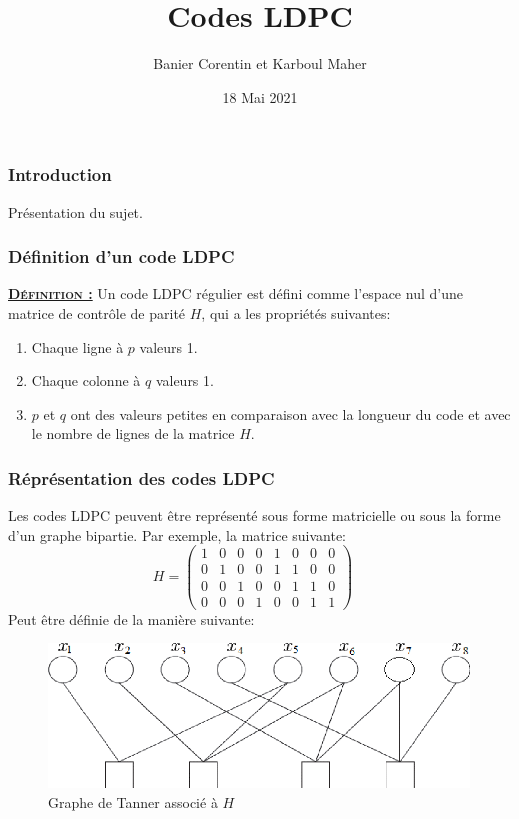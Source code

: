 \documentclass{beamer}
\title{Codes LDPC}
\author{Banier Corentin et Karboul Maher}
\institute{Université de Bordeaux}
\date{18 Mai 2021}
\begin{document}
	\begin{frame}
        \titlepage
	\end{frame}

    \begin{frame}
        \frametitle{Introduction}
        Présentation du sujet.
    \end{frame}

    \begin{frame}
        \frametitle{Définition d'un code LDPC}
        \textsc{\textbf{\underline{Définition :}}} Un code LDPC régulier est défini comme l'espace nul d'une matrice de contrôle de parité $H$, qui a les propriétés suivantes:
        \begin{enumerate}
            \item Chaque ligne à $p$ valeurs 1.
            \item Chaque colonne à $q$ valeurs 1.
            \item $p$ et $q$ ont des valeurs petites en comparaison avec la longueur du code et avec le nombre de lignes de la matrice $H$.
        \end{enumerate}
    \end{frame}

    \begin{frame}
        \frametitle{Réprésentation des codes LDPC}
        Les codes LDPC peuvent être représenté sous forme matricielle ou sous la forme d'un graphe bipartie.
        \newline Par exemple, la matrice suivante:
        $$H=
        \begin{pmatrix}
            1 & 0 & 0 & 0 & 1 & 0 & 0 & 0 \\
            0 & 1 & 0 & 0 & 1 & 1 & 0 & 0 \\
            0 & 0 & 1 & 0 & 0 & 1 & 1 & 0 \\
            0 & 0 & 0 & 1 & 0 & 0 & 1 & 1 
        \end{pmatrix}
        \quad
        $$
        Peut être définie de la manière suivante:
        \begin{figure}[!h]
            \centering
            \includegraphics[scale=0.5]{Tanner2.png}  
            \caption{Graphe de Tanner associé à $H$}
            \label{fig:Tanner2}
        \end{figure}
    \end{frame}
\end{document}
